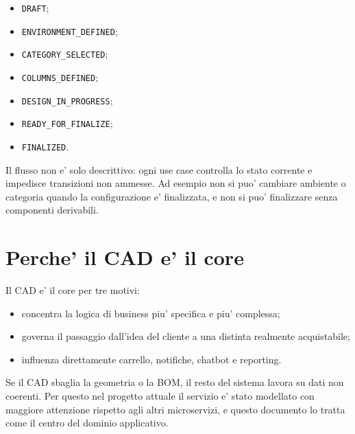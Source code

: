 \begin{itemize}
\item \texttt{DRAFT};
\item \texttt{ENVIRONMENT\_DEFINED};
\item \texttt{CATEGORY_SELECTED};
\item \texttt{COLUMNS_DEFINED};
\item \texttt{DESIGN_IN_PROGRESS};
\item \texttt{READY_FOR_FINALIZE};
\item \texttt{FINALIZED}.
\end{itemize}

Il flusso non e' solo descrittivo: ogni use case controlla lo stato corrente e impedisce transizioni non ammesse. Ad esempio non si puo' cambiare ambiente o categoria quando la configurazione e' finalizzata, e non si puo' finalizzare senza componenti derivabili.

\section{Perche' il CAD e' il core}

Il CAD e' il core per tre motivi:

\begin{itemize}
\item concentra la logica di business piu' specifica e piu' complessa;
\item governa il passaggio dall'idea del cliente a una distinta realmente acquistabile;
\item influenza direttamente carrello, notifiche, chatbot e reporting.
\end{itemize}

Se il CAD sbaglia la geometria o la BOM, il resto del sistema lavora su dati non coerenti. Per questo nel progetto attuale il servizio e' stato modellato con maggiore attenzione rispetto agli altri microservizi, e questo documento lo tratta come il centro del dominio applicativo.
